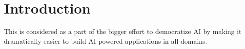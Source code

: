 \chapter{Introduction}


This is considered as a part of the bigger effort to democratize AI by making it dramatically easier to build AI-powered applications in all domains. 




